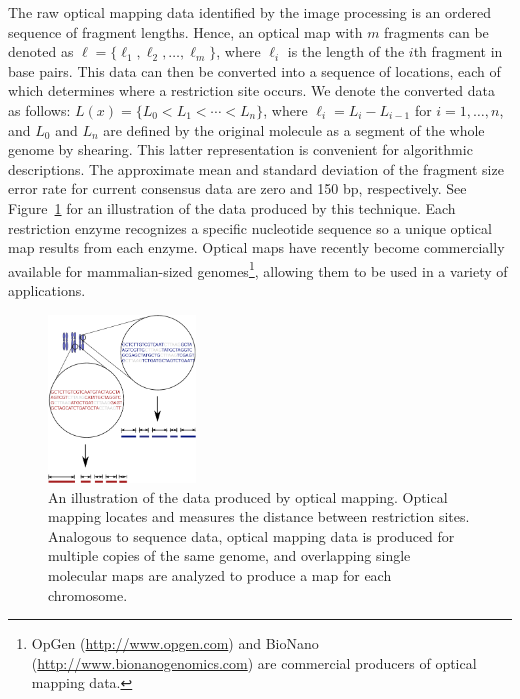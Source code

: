 The raw optical mapping data identified by the image processing is an ordered sequence of fragment lengths. Hence, an optical map with $m$ fragments can be denoted as $\ell = \{\ell_1, \ell_2, \ldots, \ell_m \}$, where $\ell_i$ is the length of the $i$th fragment in base pairs.  This  data can then be converted into a sequence of locations, each of which determines where a restriction site occurs.  We denote the converted data as follows: $L(x) = \{L_0 < L_1 < \cdots < L_n \}$, where $\ell_i = L_i - L_{i - 1}$ for $i = 1, \ldots, n$, and  $L_0$ and $L_n$ are defined by the original molecule as a segment of the whole genome by shearing. This latter representation is convenient for algorithmic descriptions. The approximate mean and standard deviation of the fragment size error rate for current consensus data \cite{error_rate} are zero and 150 bp, respectively.   See Figure~\ref{figure:fig1} for an illustration of the data produced by this technique. Each restriction enzyme recognizes a specific nucleotide sequence so a unique optical map results from each enzyme.%
Optical maps have recently become commercially available for mammalian-sized genomes\footnote{OpGen (\url{http://www.opgen.com}) and BioNano (\url{http://www.bionanogenomics.com}) are commercial producers of optical mapping data.}, allowing them to be used in a variety of applications.

\begin{figure}[h]
\centering
\includegraphics[width=0.35\textwidth]{./research_exam/slides/ormpub.eps}
\caption{An illustration of the data produced by optical mapping. Optical mapping locates and measures the distance between restriction sites.  Analogous to sequence data, optical mapping data is produced for multiple copies of the same genome, and overlapping single molecular maps are analyzed to produce a map for each chromosome.  }
\label{figure:fig1}
\end{figure}


